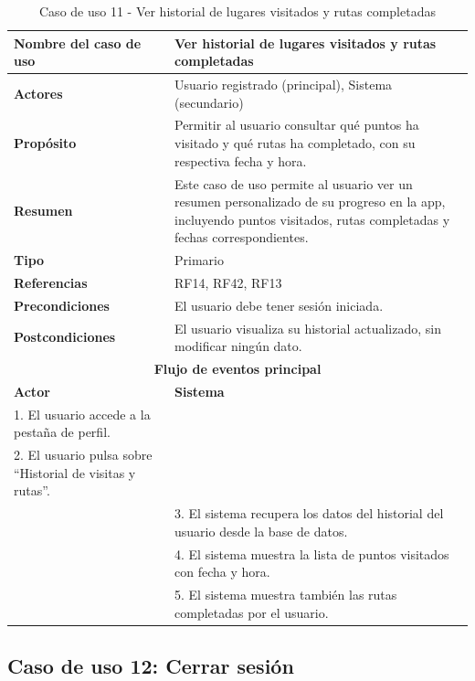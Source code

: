 \begin{table}[H]
\centering
\caption{Caso de uso 11 - Ver historial de lugares visitados y rutas completadas}
\begin{tabular}{|p{4.5cm}|p{10.5cm}|}
\hline
\textbf{Nombre del caso de uso} & Ver historial de lugares visitados y rutas completadas \\
\hline
\textbf{Actores} & Usuario registrado (principal), Sistema (secundario) \\
\hline
\textbf{Propósito} & Permitir al usuario consultar qué puntos ha visitado y qué rutas ha completado, con su respectiva fecha y hora. \\
\hline
\textbf{Resumen} & Este caso de uso permite al usuario ver un resumen personalizado de su progreso en la app, incluyendo puntos visitados, rutas completadas y fechas correspondientes. \\
\hline
\textbf{Tipo} & Primario \\
\hline
\textbf{Referencias} & RF14, RF42, RF13 \\
\hline
\textbf{Precondiciones} & El usuario debe tener sesión iniciada. \\
\hline
\textbf{Postcondiciones} & El usuario visualiza su historial actualizado, sin modificar ningún dato. \\
\hline
\multicolumn{2}{|c|}{\textbf{Flujo de eventos principal}} \\
\hline
\textbf{Actor} & \textbf{Sistema} \\
\hline
1. El usuario accede a la pestaña de perfil. & \\
\hline
2. El usuario pulsa sobre “Historial de visitas y rutas”. & \\
\hline
& 3. El sistema recupera los datos del historial del usuario desde la base de datos. \\
\hline
& 4. El sistema muestra la lista de puntos visitados con fecha y hora. \\
\hline
& 5. El sistema muestra también las rutas completadas por el usuario. \\
\hline
\end{tabular}
\end{table}

\clearpage
\subsection{Caso de uso 12: Cerrar sesión}

